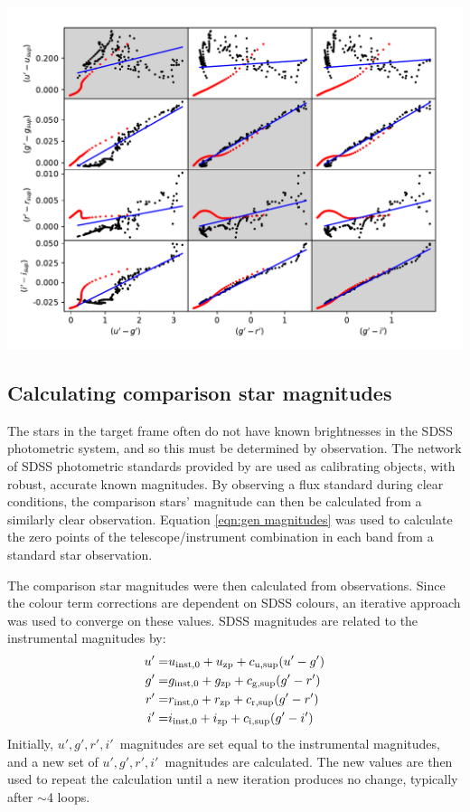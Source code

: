 \begin{minipage}{\linewidth}
    \includegraphics[width=\textwidth]{figures/observations/colour_term_tracks_HCAM.pdf}
    \label{fig:observations:HiPERCAM colour corrections}
\end{minipage}


\subsection{Calculating comparison star magnitudes}
\label{sect:comparison star mag calc}

The stars in the target frame often do not have known brightnesses in the SDSS photometric system, and so this must be determined by observation. The network of SDSS photometric standards provided by \citet{smith2002} are used as calibrating objects, with robust, accurate known magnitudes. By observing a flux standard during clear conditions, the comparison stars' magnitude can then be calculated from a similarly clear observation. 
Equation \ref{eqn:gen magnitudes} was used to calculate the zero points of the telescope/instrument combination in each band from a standard star observation. 

The comparison star magnitudes were then calculated from observations.
Since the colour term corrections are dependent on SDSS colours, an iterative approach was used to converge on these values. 
SDSS magnitudes are related to the instrumental magnitudes by:
\begin{align*}
    u' =& u_{\rm inst,0} + u_{\rm zp} + c_{\rm u, sup}(u' - g') \\
    g' =& g_{\rm inst,0} + g_{\rm zp} + c_{\rm g, sup}(g' - r') \\
    r' =& r_{\rm inst,0} + r_{\rm zp} + c_{\rm r, sup}(g' - r') \\
    i' =& i_{\rm inst,0} + i_{\rm zp} + c_{\rm i, sup}(g' - i') \\
\end{align*}
Initially, $u',g',r',i'$\ magnitudes are set equal to the instrumental magnitudes, and a new set of $u',g',r',i'$\ magnitudes are calculated. The new values are then used to repeat the calculation until a new iteration produces no change, typically after $\sim$4 loops.


